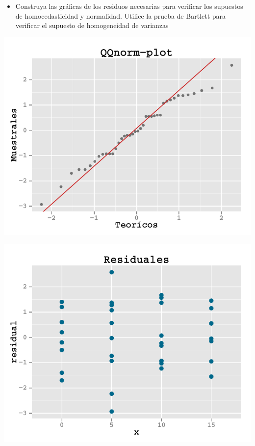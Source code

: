 \documentclass[a4paper]{scrartcl}\usepackage[]{graphicx}\usepackage[]{color}
\makeatletter
\def\maxwidth{ %
  \ifdim\Gin@nat@width>\linewidth
    \linewidth
  \else
    \Gin@nat@width
  \fi
}
\newenvironment{knitrout}{}{} %
\makeatother
\begin{document}
\begin{itemize}
  \item Construya las gráficas de los residuos necesarias para verificar los supuestos de homocedasticidad y normalidad. Utilice la prueba de Bartlett para verificar el supuesto de homogeneidad de varianzas 
\end{itemize}

\begin{knitrout}
\color{fgcolor}

{\centering \includegraphics[width=\maxwidth]{figure/unnamed-chunk-171} 

}




{\centering \includegraphics[width=\maxwidth]{figure/unnamed-chunk-172} 

}



\end{knitrout}
\end{document}

